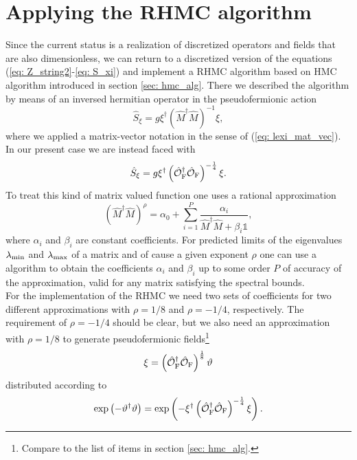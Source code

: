 \section{Applying the RHMC algorithm}
Since the current status is a realization of discretized operators and fields that are also dimensionless, we can return to a discretized version of the equations (\ref{eq: Z_string2}-\ref{eq: S_xi}) and implement a RHMC algorithm based on HMC algorithm introduced in section \ref{sec: hmc_alg}. There we described the algorithm by means of an inversed hermitian operator in the pseudofermionic action
%
%
\begin{equation}
\hat{S}_{\xi} = g \xi^{\dagger}\left(\hat{M}^{\dagger}\hat{M}\right)^{-1}\xi,
\end{equation}
%
%
where we applied a matrix-vector notation in the sense of (\ref{eq: lexi_mat_vec}). In our present case we are instead faced with
%
%
\begin{equation}
\hat{S}_{\xi} = g \xi^{\dagger}\left(\hat{\mathcal{O}}_{\rm F}^{\dagger}\hat{\mathcal{O}}_{\rm F}\right)^{-\frac{1}{4}} \xi.
\end{equation}
%
%
To treat this kind of matrix valued function one uses a rational approximation
%
%
\begin{equation}
\left(\hat{M}^{\dagger}\hat{M}\right)^{\rho	} = \alpha_{0} + \sum\limits_{i=1}^{P} \frac{\alpha_{i}}{\hat{M}^{\dagger}\hat{M}+\beta_{i}\mathds{1}},
\label{eq: rat_approx}
\end{equation}
%
%
where $\alpha_{i}$ and $\beta_{i}$ are constant coefficients. For predicted limits of the eigenvalues $\lambda_{\rm min}$ and $\lambda_{\rm max}$ of a matrix and of cause a given exponent $\rho$ one can use a  algorithm to obtain the coefficients $\alpha_{i}$ and $\beta_{i}$ up to some order $P$ of accuracy of the approximation, valid for any matrix satisfying the spectral bounds.\\
For the implementation of the RHMC we need two sets of coefficients for two different approximations with $\rho=1/8$ and $\rho=-1/4$, respectively. The requirement of $\rho=-1/4$ should be clear, but we also need an approximation with $\rho=1/8$ to generate pseudofermionic fields\footnote{Compare to the list of items in section \ref{sec: hmc_alg}.} 
%
%
\begin{equation}
\xi = \left(\hat{\mathcal{O}}_{\rm F}^{\dagger}\hat{\mathcal{O}}_{\rm F}\right)^{\frac{1}{8}} \vartheta
\end{equation}
%
%
distributed according to
%
%
\begin{equation}
\exp\left(-\vartheta^{\dagger}\vartheta\right) = \exp\left( -\xi^{\dagger}\left(\hat{\mathcal{O}}_{\rm F}^{\dagger}\hat{\mathcal{O}}_{\rm F}\right)^{-\frac{1}{4}} \xi \right).
\end{equation}
